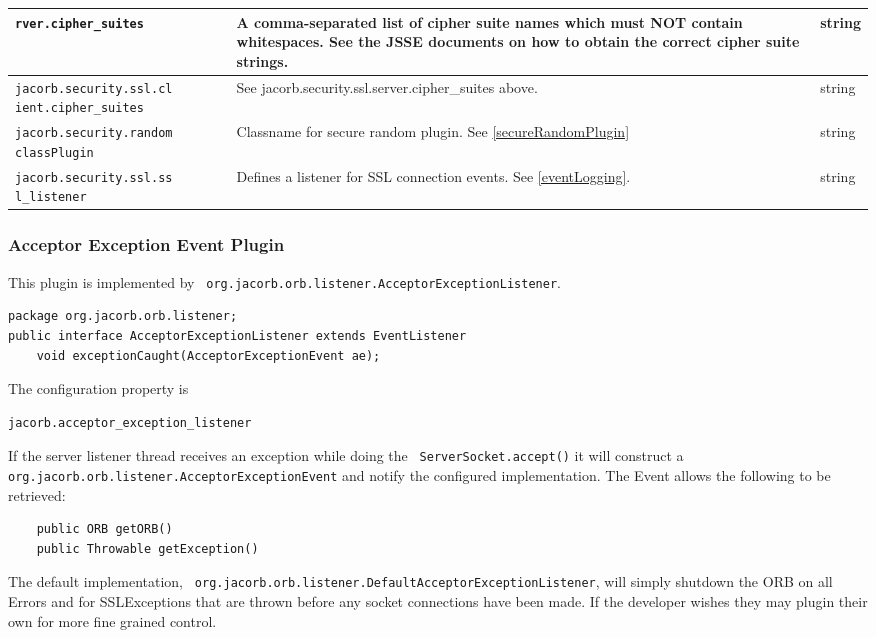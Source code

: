 {{\begin{small}
\begin{longtable}{|p{5cm}|p{9cm}|p{2cm}|}
\verb"rver.cipher_suites" & A comma-separated list of cipher suite names which must NOT contain whitespaces. See the JSSE documents on how to obtain the correct cipher suite strings. & string \\
\hline
\verb"jacorb.security.ssl.cl"
\verb"ient.cipher_suites" & See jacorb.security.ssl.server.cipher\_suites above. & string \\
\hline
\verb"jacorb.security.random"
\verb"classPlugin" & Classname for secure random plugin. See \ref{secureRandomPlugin} & string \\
\hline
\verb"jacorb.security.ssl.ss"
\verb"l_listener" & Defines a listener for SSL connection events. See \ref{eventLogging}.
& string \\
\hline
\end{longtable}
\end{small}

\subsubsection{Acceptor Exception Event Plugin}
\label{acceptorevent}
This plugin is implemented by {\tt
org.jacorb.orb.listener.AcceptorExceptionListener}.
\begin{small}
\begin{verbatim}
package org.jacorb.orb.listener;
public interface AcceptorExceptionListener extends EventListener
    void exceptionCaught(AcceptorExceptionEvent ae);
\end{verbatim}
\end{small}
The configuration property is
\begin{verbatim}
jacorb.acceptor_exception_listener
\end{verbatim}
If the server listener thread receives an exception while doing the {\tt
ServerSocket.accept()} it will construct a {\tt
org.jacorb.orb.listener.AcceptorExceptionEvent} and notify the configured
implementation. The Event allows the following to be retrieved:
\begin{small}
\begin{verbatim}
    public ORB getORB()
    public Throwable getException()
\end{verbatim}
\end{small}
The default implementation, {\tt
org.jacorb.orb.listener.DefaultAcceptor\-ExceptionListener}, will simply shutdown
the ORB on all Errors and for SSLExceptions that are thrown before any socket
connections have been made. If the developer wishes they may plugin
their own for more fine grained control.

}}
